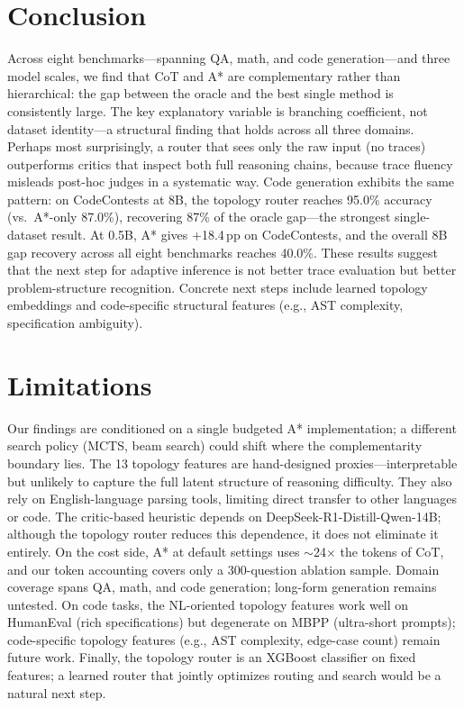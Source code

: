 \documentclass[11pt]{article}
\begin{document}
{\section{Conclusion}
Across eight benchmarks---spanning QA, math, and code generation---and three model scales, we find that CoT and A* are complementary rather than hierarchical: the gap between the oracle and the best single method is consistently large. The key explanatory variable is branching coefficient, not dataset identity---a structural finding that holds across all three domains. Perhaps most surprisingly, a router that sees only the raw input (no traces) outperforms critics that inspect both full reasoning chains, because trace fluency misleads post-hoc judges in a systematic way. Code generation exhibits the same pattern: on CodeContests at 8B, the topology router reaches 95.0\% accuracy (vs.\ A*-only 87.0\%), recovering 87\% of the oracle gap---the strongest single-dataset result. At 0.5B, A* gives +18.4\,pp on CodeContests, and the overall 8B gap recovery across all eight benchmarks reaches 40.0\%. These results suggest that the next step for adaptive inference is not better trace evaluation but better problem-structure recognition. Concrete next steps include learned topology embeddings and code-specific structural features (e.g., AST complexity, specification ambiguity).

\section*{Limitations}
\label{sec:limitations}
Our findings are conditioned on a single budgeted A* implementation; a different search policy (MCTS, beam search) could shift where the complementarity boundary lies. The 13 topology features are hand-designed proxies---interpretable but unlikely to capture the full latent structure of reasoning difficulty. They also rely on English-language parsing tools, limiting direct transfer to other languages or code. The critic-based heuristic depends on DeepSeek-R1-Distill-Qwen-14B; although the topology router reduces this dependence, it does not eliminate it entirely. On the cost side, A* at default settings uses $\sim$24$\times$ the tokens of CoT, and our token accounting covers only a 300-question ablation sample. Domain coverage spans QA, math, and code generation; long-form generation remains untested. On code tasks, the NL-oriented topology features work well on HumanEval (rich specifications) but degenerate on MBPP (ultra-short prompts); code-specific topology features (e.g., AST complexity, edge-case count) remain future work. Finally, the topology router is an XGBoost classifier on fixed features; a learned router that jointly optimizes routing and search would be a natural next step.

}
\end{document}
